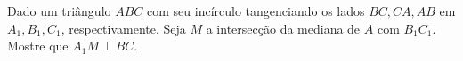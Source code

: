 Dado um triângulo $ABC$ com seu incírculo tangenciando os lados $BC,CA,AB$ em $A_1,B_1,C_1$, respectivamente. Seja $M$ a intersecção da mediana de $A$ com $B_1C_1$. Mostre que $A_1M\perp BC$.
